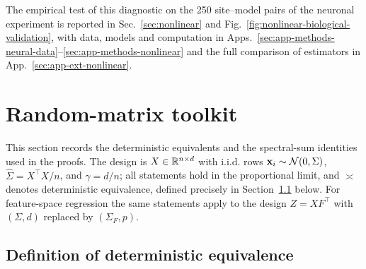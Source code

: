 {The empirical test of this diagnostic on the 250 site--model pairs of the neuronal experiment is reported in Sec.~\ref{sec:nonlinear} and Fig.~\ref{fig:nonlinear-biological-validation}, with data, models and computation in Apps.~\ref{sec:app-methods-neural-data}--\ref{sec:app-methods-nonlinear} and the full comparison of estimators in App.~\ref{sec:app-ext-nonlinear}.

\section{Random-matrix toolkit}
\label{sec:app-rmt-toolkit}
\label{sec:app-de-toolkit}

This section records the deterministic equivalents and the spectral-sum
identities used in the proofs.  The design is $X\in\mathbb{R}^{n\times d}$ with
i.i.d. rows $\mathbf{x}_i\sim\mathcal N(0,\Sigma)$, $\hat\Sigma=X^\top X/n$, and
$\gamma=d/n$; all statements hold in the proportional limit, and $\asymp$
denotes deterministic equivalence, defined precisely in
Section~\ref{sec:app-de-definition} below. 
For feature-space regression the same statements apply to the design $Z=XF^\top$
with $(\Sigma,d)$ replaced by $(\Sigma_F,p)$.

\subsection{Definition of deterministic equivalence}
\label{sec:app-de-definition}

}
